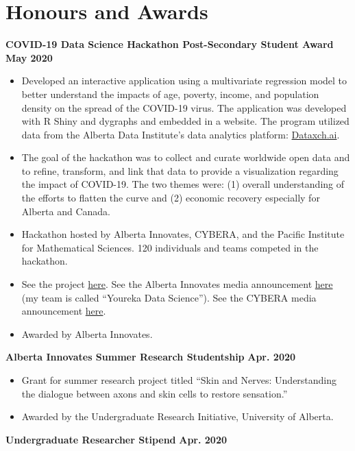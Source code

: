\documentclass{article}
\begin{document}
\section*{\textcolor{my_red}{Honours and Awards}}
    \textbf{COVID-19 Data Science Hackathon Post-Secondary Student Award} \hfill \textbf{May 2020}
    \begin{itemize}
        \item Developed an interactive application using a multivariate regression model to better understand the impacts of age, poverty, income, and population density on the spread of the COVID-19 virus. The application was developed with R Shiny and dygraphs and embedded in a website. The program utilized data from the Alberta Data Institute's data analytics platform: \href{https://dataxch.ai}{Dataxch.ai}.
        \item The goal of the hackathon was to collect and curate worldwide open data and to refine, transform, and link that data to provide a visualization regarding the impact of COVID-19. The two themes were: (1) overall understanding of the efforts to flatten the curve and (2) economic recovery especially for Alberta and Canada.
        \item Hackathon hosted by Alberta Innovates, CYBERA, and the Pacific Institute for Mathematical Sciences. 120 individuals and teams competed in the hackathon.
        \item See the project \href{https://yourekacanada.org/index}{here}. See the Alberta Innovates media announcement \href{https://albertainnovates.ca/impact/newsroom/flattening-the-curve-and-promoting-economic-recovery-through-innovation}{here} (my team is called ``Youreka Data Science''). See the CYBERA media announcement \href{https://www.cybera.ca/news-and-events/news/covid-19-data-science-hackathon-winners/}{here}.
        \item Awarded by Alberta Innovates.
    \end{itemize}
    \textbf{Alberta Innovates Summer Research Studentship} \hfill \textbf{Apr. 2020}
    \begin{itemize}
        \item Grant for summer research project titled ``Skin and Nerves: Understanding the dialogue between axons and skin cells to restore sensation.''
        \item Awarded by the Undergraduate Research Initiative, University of Alberta.
    \end{itemize}
    \textbf{Undergraduate Researcher Stipend} \hfill \textbf{Apr. 2020}
\end{document}
